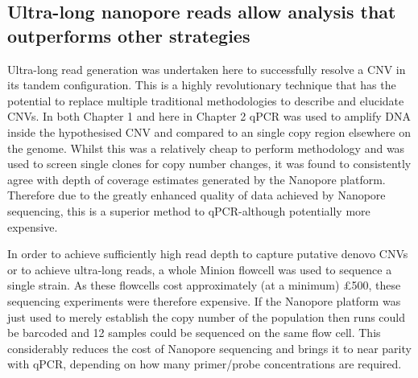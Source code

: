 \documentclass{article}
\begin{document}






\subsection{Ultra-long nanopore reads allow analysis that outperforms other strategies}

Ultra-long read generation was undertaken here to successfully resolve a CNV in its tandem configuration. This is a highly revolutionary technique that has the potential to replace multiple traditional methodologies to describe and elucidate CNVs. In both Chapter 1 and here in Chapter 2 qPCR was used to amplify DNA inside the hypothesised CNV and compared to an single copy region elsewhere on the genome. Whilst this was a relatively cheap to perform methodology and was used to screen single clones for copy number changes, it was found to consistently agree with depth of coverage estimates generated by the Nanopore platform. Therefore due to the greatly enhanced quality of data achieved by Nanopore sequencing, this is a superior method to qPCR-although potentially more expensive. 

In order to achieve sufficiently high read depth to capture putative denovo CNVs or to achieve ultra-long reads, a whole Minion flowcell was used to sequence a single strain. As these flowcells cost approximately (at a minimum) £500, these sequencing experiments were therefore expensive. If the Nanopore platform was just used to merely establish the copy number of the population then runs could be barcoded and 12 samples could be sequenced on the same flow cell. This considerably reduces the cost of Nanopore sequencing and brings it to near parity with qPCR, depending on how many primer/probe concentrations are required. 
\end{document}
